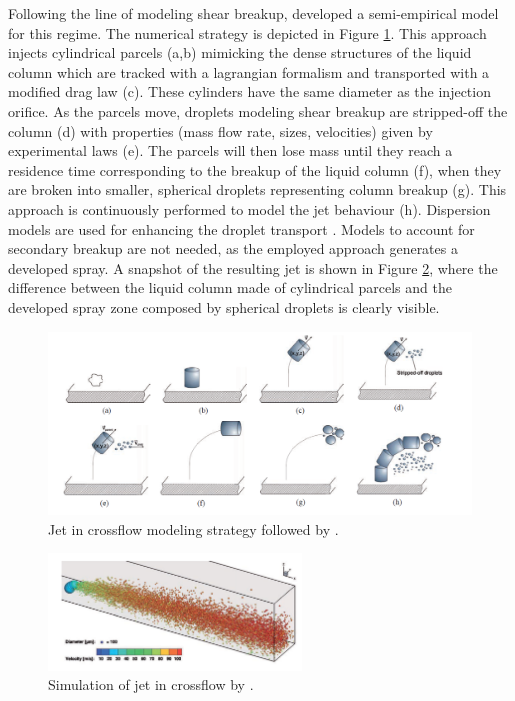 Following the line of modeling shear breakup,  developed a semi-empirical model for this regime. The numerical strategy is depicted in Figure \ref{fig:eckel_2016_modeling_strategy}. This approach injects cylindrical parcels (a,b) mimicking the dense structures of the liquid column which are tracked with a lagrangian formalism and transported with a modified drag law (c). These cylinders have the same diameter as the injection orifice.  As the parcels move, droplets modeling shear breakup are stripped-off the column (d) with properties (mass flow rate, sizes, velocities) given by experimental laws (e). The parcels will then lose mass until they reach a residence time corresponding to the breakup of the liquid column (f), when they are broken into smaller, spherical droplets representing column breakup (g). This approach is continuously performed to model the jet behaviour (h). Dispersion models are used for enhancing the droplet transport . Models to account for secondary breakup are not needed, as the employed approach generates a developed spray. A snapshot of the resulting jet is shown in Figure \ref{fig:eckel_2016_jet}, where the difference between the liquid column made of cylindrical parcels and the developed spray zone composed by spherical droplets is clearly visible. 

\begin{figure}[ht]
    \centering
    \includegraphics[width=1.0\textwidth]{./part1_numerical_approaches/figures_ch3/eckel_2016_modeling_strategy}
       \centering
    \caption{Jet in crossflow modeling strategy followed by .}
    \label{fig:eckel_2016_modeling_strategy}
\end{figure}

\begin{figure}[ht]
    \centering
    \includegraphics[width=0.6\textwidth]{./part1_numerical_approaches/figures_ch3/eckel_2016_jet}
       \centering
    \caption{Simulation of jet in crossflow by .}
    \label{fig:eckel_2016_jet}
\end{figure}


